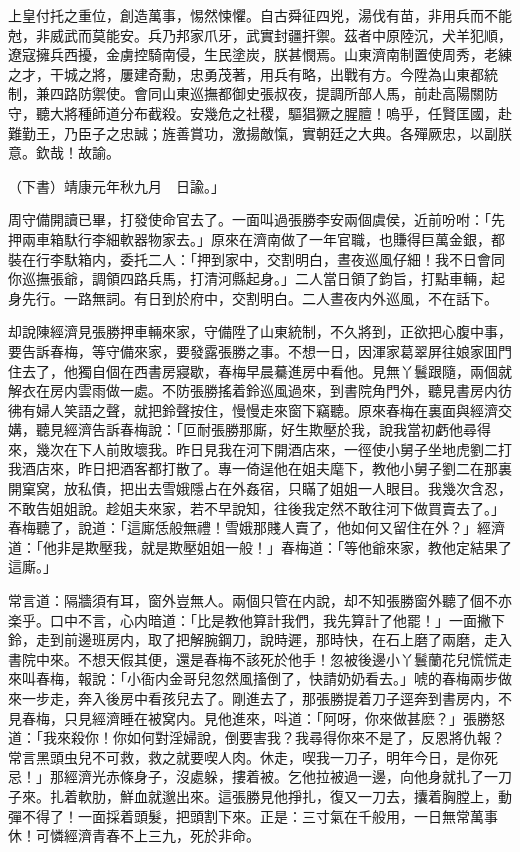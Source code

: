 上皇付托之重位，創造萬事，惕然悚懼。自古舜征四兇，湯伐有苗，非用兵而不能尅，非威武而莫能安。兵乃邦家爪牙，武實封疆扞禦。茲者中原陸沉，犬羊犯順，遼寇擁兵西擾，金虜控騎南侵，生民塗炭，朕甚憫焉。山東濟南制置使周秀，老練之才，干城之將，屢建奇勳，忠勇茂著，用兵有略，出戰有方。今陞為山東都統制，兼四路防禦使。會同山東巡撫都御史張叔夜，提調所部人馬，前赴高陽關防守，聽大將種師道分布截殺。安幾危之社稷，驅猖獗之腥膻！嗚乎，任賢匡國，赴難勤王，乃臣子之忠誠；旌善賞功，激揚敵愾，實朝廷之大典。各殫厥忠，以副朕意。欽哉！故諭。

（下書）靖康元年秋九月　日諭。」

周守備開讀已畢，打發使命官去了。一面叫過張勝李安兩個虞侯，近前吩咐：「先押兩車箱馱行李細軟器物家去。」原來在濟南做了一年官職，也賺得巨萬金銀，都裝在行李馱箱内，委托二人：「押到家中，交割明白，晝夜巡風仔細！我不日會同你巡撫張爺，調領四路兵馬，打清河縣起身。」二人當日領了鈞旨，打點車輛，起身先行。一路無詞。有日到於府中，交割明白。二人晝夜内外巡風，不在話下。

却說陳經濟見張勝押車輛來家，守備陞了山東統制，不久將到，正欲把心腹中事，要告訴春梅，等守備來家，要發露張勝之事。不想一日，因渾家葛翠屏往娘家囬門住去了，他獨自個在西書房寢歇，春梅早晨驀進房中看他。見無丫鬟跟隨，兩個就解衣在房内雲雨做一處。不防張勝搖着鈴巡風過來，到書院角門外，聽見書房内彷彿有婦人笑語之聲，就把鈴聲按住，慢慢走來窗下竊聽。原來春梅在裏面與經濟交媾，聽見經濟告訴春梅說：「叵耐張勝那廝，好生欺壓於我，說我當初虧他尋得來，幾次在下人前敗壞我。昨日見我在河下開酒店來，一徑使小舅子坐地虎劉二打我酒店來，昨日把酒客都打散了。專一倚逞他在姐夫麾下，教他小舅子劉二在那裏開窠窝，放私債，把出去雪娥隱占在外姦宿，只瞞了姐姐一人眼目。我幾次含忍，不敢告姐姐說。趁姐夫來家，若不早說知，往後我定然不敢往河下做買賣去了。」春梅聽了，說道：「這廝恁般無禮！雪娥那賤人賣了，他如何又留住在外？」經濟道：「他非是欺壓我，就是欺壓姐姐一般！」春梅道：「等他爺來家，教他定結果了這廝。」

常言道：隔牆須有耳，窗外豈無人。兩個只管在内說，却不知張勝窗外聽了個不亦楽乎。口中不言，心内暗道：「比是教他算計我們，我先算計了他罷！」一面撇下鈴，走到前邊班房内，取了把解腕鋼刀，說時遲，那時快，在石上磨了兩磨，走入書院中來。不想天假其便，還是春梅不該死於他手！忽被後邊小丫鬟蘭花兒慌慌走來叫春梅，報說：「小衙内金哥兒忽然風搐倒了，快請奶奶看去。」唬的春梅兩步做來一步走，奔入後房中看孩兒去了。剛進去了，那張勝提着刀子逕奔到書房内，不見春梅，只見經濟睡在被窝内。見他進來，呌道：「阿呀，你來做甚麽？」張勝怒道：「我來殺你！你如何對淫婦說，倒要害我？我尋得你來不是了，反恩將仇報？常言黑頭虫兒不可救，救之就要喫人肉。休走，喫我一刀子，明年今日，是你死忌！」那經濟光赤條身子，沒處躲，摟着被。乞他拉被過一邊，向他身就扎了一刀子來。扎着軟肋，鮮血就邈出來。這張勝見他掙扎，復又一刀去，攮着胸膛上，動彈不得了！一面採着頭髮，把頭割下來。正是：三寸氣在千般用，一日無常萬事休！可憐經濟青春不上三九，死於非命。

